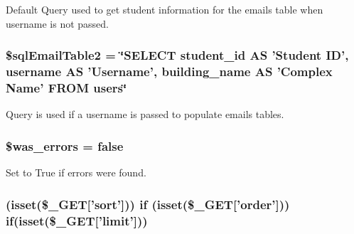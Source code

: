 \-Default \-Query used to get student information for the emails table when username is not passed. \hypertarget{email_8php_ac3b358280147913d285c50c83ac0b9a4}{
\subsubsection[{\$sql\-Email\-Table2}]{\setlength{\rightskip}{0pt plus 5cm}\$sql\-Email\-Table2 = \char`\"{}\-S\-E\-L\-E\-C\-T student\-\_\-id \-A\-S '\-Student \-I\-D', username \-A\-S '\-Username', building\-\_\-name \-A\-S '\-Complex \-Name' \-F\-R\-O\-M users\char`\"{}}}\label{email_8php_ac3b358280147913d285c50c83ac0b9a4}
\-Query is used if a username is passed to populate emails tables. \hypertarget{email_8php_ae8f928f475945454d3cfd1d4214c09f2}{
\subsubsection[{\$was\-\_\-errors}]{\setlength{\rightskip}{0pt plus 5cm}\$was\-\_\-errors = false}}\label{email_8php_ae8f928f475945454d3cfd1d4214c09f2}
\-Set to \-True if errors were found. \hypertarget{email_8php_aea6d4532c33261281e47f8368257f1a9}{
\subsubsection[{if}]{ (isset(\$\-\_\-\-G\-E\-T\mbox{[}'sort'\mbox{]})) {\bf if} (isset(\$\-\_\-\-G\-E\-T\mbox{[}'order'\mbox{]})) {\bf if}(isset(\$\-\_\-\-G\-E\-T\mbox{[}'limit'\mbox{]}))}}\label{email_8php_aea6d4532c33261281e47f8368257f1a9}
